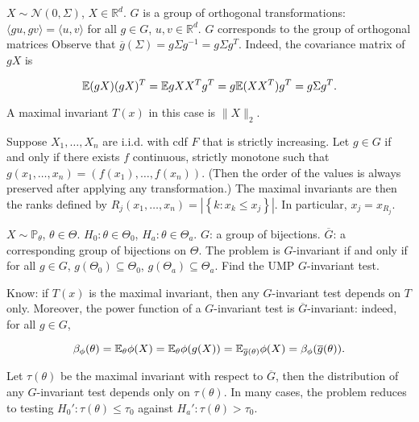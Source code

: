 \begin{example}

\(X \sim \mathcal{N}(0, \Sigma)\), \(X \in \mathbb{R}^d\). \(G\) is a group of orthogonal transformations: \(\langle gu, gv \rangle = \langle u , v \rangle\) for all \(g \in G\), \(u, v \in \mathbb{R}^d\). \(G\) corresponds to the 
group of orthogonal matrices Observe that \(\overline{g}(\Sigma) = g \Sigma g^{-1} = g \Sigma g^T\). Indeed, the covariance matrix of \(gX\) is 

\[
\E (gX)(gX)^T = \E g X X^T g^T = g \E (X X^T) g^T = g \Sigma g^T.
\]

A maximal invariant \(T(x)\) in this case is \(\lVert X \rVert_2\). 

\end{example}

\begin{example}

Suppose \(X_1, \ldots, X_n\) are i.i.d. with cdf \(F\) that is strictly increasing. Let \(g \in G\) if and only if there exists \(f\) continuous, strictly monotone such that \(g(x_1, \ldots, x_n) = (f(x_1), \ldots, f(x_n))\). (Then the order of the values is always preserved after applying any transformation.) The maximal invariants are then the ranks defined by \(R_j(x_1, \ldots, x_n) = | \left\{  k: x_k \leq x_j\right\}|\). In particular, \(x_j = x_{R_j}\). 

\end{example}

\begin{example}

\(X \sim \mathbb{P}_\theta\), \(\theta \in \Theta\). \(H_0: \theta \in \Theta_0\), \(H_a: \theta \in \Theta_a\). \(G\): a group of bijections. \(\overline{G}\): a corresponding group of bijections on \(\Theta\). The problem is \(G\)-invariant if and only if for all \(g \in G\), \(g(\Theta_0) \subseteq \Theta_0\), \(g(\Theta_a) \subseteq \Theta_a\). Find the UMP \(G\)-invariant test.

\end{example}

\begin{solution}

Know: if \(T(x)\) is the maximal invariant, then any \(G\)-invariant test depends on \(T\) only. Moreover, the power function of a \(G\)-invariant test is \(\overline{G}\)-invariant: indeed, for all \(g \in G\), 

\[
\beta_\phi(\theta) = \E_\theta \phi(X) = \E_\theta \phi(g(X)) = \E_{\overline{g}(\theta)} \phi(X) = \beta_\phi (\overline{g}(\theta)).
\]

Let \(\tau(\theta)\) be the maximal invariant with respect to \(\overline{G}\), then the distribution of any \(G\)-invariant test depends only on \(\tau(\theta)\). In many cases, the problem reduces to testing \(H_0': \tau (\theta) \leq \tau_0\) against \(H_a': \tau(\theta) > \tau_0\).

\end{solution}


